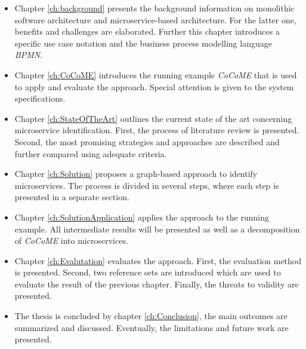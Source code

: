 \begin{itemize}
	\item  Chapter \ref{ch:background} presents the background information on monolithic software architecture and microservice-based architecture. For the latter one, benefits and challenges are elaborated. Further this chapter introduces a specific use case notation and the business process modelling language \textit{BPMN.}
	\item Chapter \ref{ch:CoCoME} introduces the running example \textit{CoCoME} that is used to apply and evaluate the approach. Special attention is given to the system specifications.
	\item Chapter \ref{ch:StateOfTheArt} outlines the current state of the art concerning microservice identification. First, the process of literature review is presented. Second, the most promising strategies and approaches are described and further compared using adequate criteria.
	\item Chapter \ref{ch:Solution} proposes a graph-based approach to identify microservices. The process is divided in several steps, where each step is presented in a separate section.
	\item Chapter \ref{ch:SolutionApplication} applies the approach to the running example. All intermediate results will be presented as well as a decomposition of \textit{CoCoME} into microservices.
    \item Chapter \ref{ch:Evalutation} evaluates the approach. First, the evaluation method is presented. Second, two reference sets are introduced which are used to evaluate the result of the previous chapter. Finally, the threats to validity are presented.
    \item The thesis is concluded by chapter \ref{ch:Conclusion}, the main outcomes are summarized and discussed. Eventually, the limitations and future work are presented.
    

\end{itemize}











